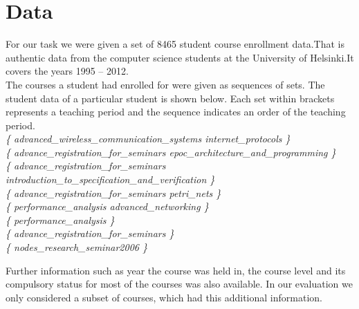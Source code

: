 \section{Data}
For our task we were given a set of 8465 student course enrollment data.That is authentic data from the computer science students at the University of Helsinki.It covers the years 1995 – 2012.\\

The courses a student had enrolled for were given as sequences of sets. The student data of a particular student is shown below. Each set within { } brackets represents a teaching period and the sequence indicates an order of the teaching period.\\

\textit{
\{ advanced\_wireless\_communication\_systems internet\_protocols \}\\
\{ advance\_registration\_for\_seminars epoc\_architecture\_and\_programming \}\\
\{ advance\_registration\_for\_seminars introduction\_to\_specification\_and\_verification \}\\
\{ advance\_registration\_for\_seminars petri\_nets \}\\
\{ performance\_analysis advanced\_networking \}\\
\{ performance\_analysis \}\\
\{ advance\_registration\_for\_seminars \}\\
\{ nodes\_research\_seminar2006 \}\\
}

Further information such as year the course was held in, the course level and its compulsory status for most of the courses was also available. In our evaluation we only considered a subset of courses, which had this additional information.
